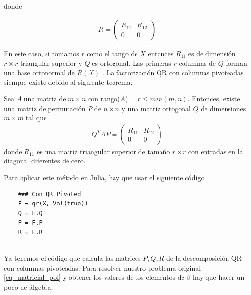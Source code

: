donde 

\begin{equation*}
    \begin{aligned}
    R = 
    \begin{pmatrix}
    R_{11} & R_{12} \\
    0      & 0
    \end{pmatrix}
    \end{aligned}
\end{equation*}

En este caso, si tomamos $r$ como el rango de $X$ entonces $R_{11}$ es de dimensión $r \times r$ triangular superior y $Q$ es ortogonal. Las primeras $r$ columnas de $Q$ forman una base ortonormal de $R(X)$ \cite{numerical_linear_algebra}. La factorización QR con columnas pivoteadas  siempre existe debido al siguiente teorema.

\begin{theorem} \label{exitencia_QR_dec}
Sea $A$ una matriz de $m \times n$ con rango($A$) = $r \leq min (m, n)$. Entonces, existe una matriz de permutación $P$ de $n \times n$ y una matriz ortogonal $Q$ de dimensiones $m \times m$ tal que 
\begin{equation*}
\begin{aligned}
Q^{T}AP = 
\begin{pmatrix}
R_{11} & R_{12} \\
   0      & 0
\end{pmatrix}
\end{aligned}
\end{equation*}
donde $R_{11}$ es una matriz triangular superior de tamaño $r \times r$ con entradas en la diagonal diferentes de cero. 
\end{theorem}

\cite{numerical_linear_algebra}


Para aplicar este método en Julia, hay que usar el siguiente código

\begin{verbatim}
    ### Con QR Pivoted
    F = qr(X, Val(true))
    Q = F.Q
    P = F.P
    R = F.R
\end{verbatim}

\\

Ya tenemos el código que calcula las matrices $P, Q, R$ de la descomposición QR con columnas pivoteadas. Para resolver nuestro problema original \ref{eq_matricial_pol} y obtener los valores de los elementos de $\beta$ hay que hacer un poco de álgebra. 

